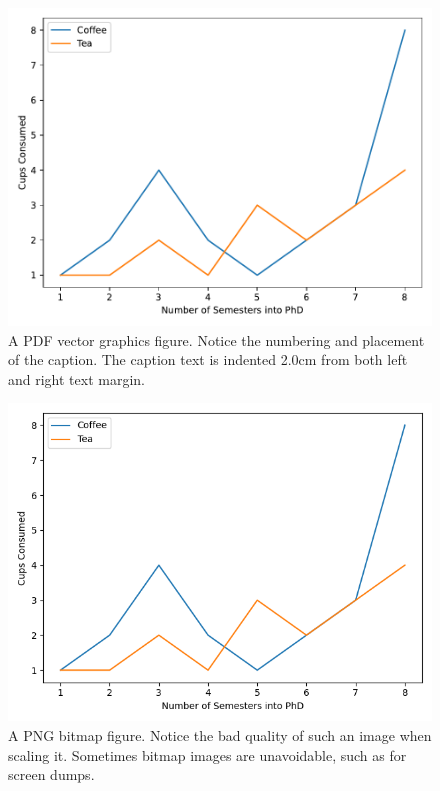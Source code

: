 \begin{figure}
\centering
\includegraphics[width=1\linewidth]{Figures/Figure_1.pdf} 
\caption{A PDF vector graphics figure. Notice the numbering and placement of the caption. The caption text is indented 2.0cm from both left and right text margin.}\label{fig:vectorg}
\end{figure}

\begin{figure}
\centering
\includegraphics[width=1\linewidth]{Figures/Figure_1.png} 
\caption{A PNG bitmap figure. Notice the bad quality of such an image when scaling it. Sometimes bitmap images are unavoidable, such as for screen dumps.}\label{fig:rasterg}
\end{figure}

